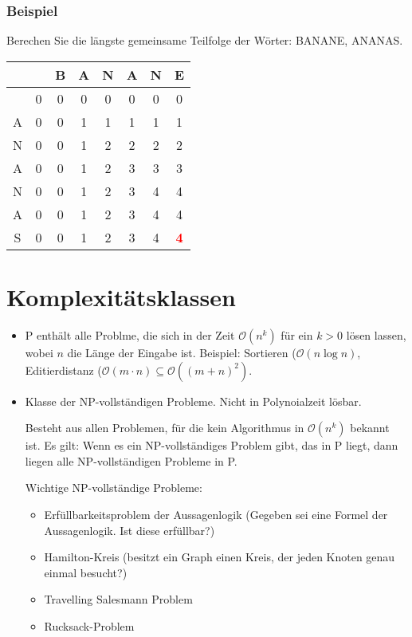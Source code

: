 \subsubsection{Beispiel}
Berechen Sie die längste gemeinsame Teilfolge  der Wörter: BANANE, ANANAS.
\begin{center}
	\begin{tabular}{c|ccccccc}
		& \ & B & A & N & A & N & E \\ \hline
		& 0 & 0 & 0 & 0 & 0 & 0 & 0 \\
	A	& 0 & 0 & 1 & 1 & 1 & 1 & 1 \\
	N	& 0 & 0 & 1 & 2 & 2 & 2 & 2 \\
	A	& 0 & 0 & 1 & 2 & 3 & 3 & 3 \\
	N	& 0 & 0 & 1 & 2 & 3 & 4 & 4 \\
	A	& 0 & 0 & 1 & 2 & 3 & 4 & 4 \\
	S	& 0 & 0 & 1 & 2 & 3 & 4 & \textbf{\textcolor{red}{4}}
	\end{tabular}
\end{center}

\section{Komplexitätsklassen}
\begin{itemize}
	\item P enthält alle Problme, die sich in der Zeit \(\mathcal{O}(n^{k})\) für ein \(k>0\) lösen lassen, wobei \(n\) die Länge der Eingabe ist.
		Beispiel: Sortieren (\(\mathcal{O}(n \log n)\), Editierdistanz (\(\mathcal{O}(m \cdot n) \subseteq \mathcal{O}((m+n)^{2})\).
	\item Klasse der NP-vollständigen Probleme. Nicht in Polynoialzeit lösbar.
	
	Besteht aus allen Problemen, für die kein Algorithmus in \(\mathcal{O}(n^{k})\) bekannt ist.
	Es gilt: Wenn es ein NP-vollständiges Problem gibt, das in P liegt, dann liegen alle NP-vollständigen Probleme in P.
	
	Wichtige NP-vollständige Probleme:
	\begin{itemize}
		\item Erfüllbarkeitsproblem der Aussagenlogik (Gegeben sei eine Formel der Aussagenlogik. Ist diese erfüllbar?)
		\item Hamilton-Kreis (besitzt ein Graph einen Kreis, der jeden Knoten genau einmal besucht?)
		\item Travelling Salesmann Problem
		\item Rucksack-Problem
	\end{itemize}
\end{itemize}

